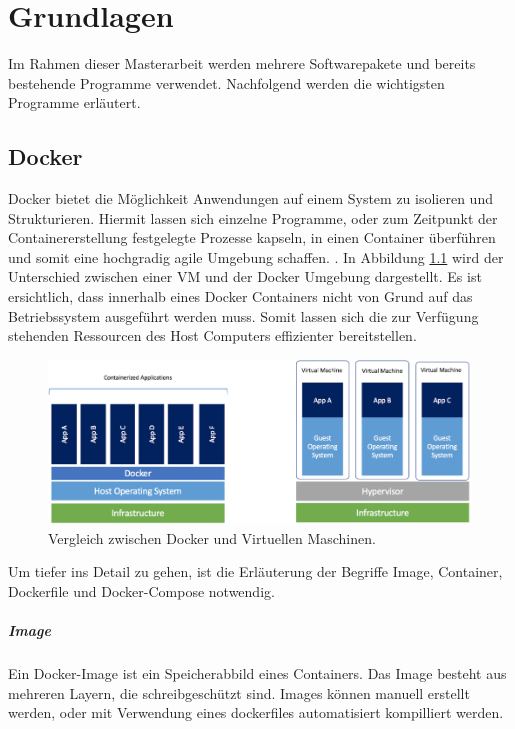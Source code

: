 \chapter{Grundlagen}
\label{Grundlagen}
Im Rahmen dieser Masterarbeit werden mehrere Softwarepakete und bereits bestehende Programme verwendet. Nachfolgend werden die wichtigsten Programme erläutert.
	\section{Docker}
	\label{Grundlagen:Docker}
		Docker bietet die Möglichkeit Anwendungen auf einem System zu isolieren und Strukturieren.
		Hiermit lassen sich einzelne Programme, oder zum Zeitpunkt der Containererstellung festgelegte Prozesse kapseln, in einen Container überführen und somit eine hochgradig agile Umgebung schaffen. \cite{dockerGetStarted}.
		In Abbildung \ref{fig:Grundlagen:Docker:DockerVsVM} wird der Unterschied zwischen einer \gls{VM} und der Docker Umgebung dargestellt.
		Es ist ersichtlich, dass innerhalb eines Docker Containers nicht von Grund auf das Betriebssystem ausgeführt werden muss. 
		Somit lassen sich die zur Verfügung stehenden Ressourcen des Host Computers effizienter bereitstellen.
		\begin{figure}[H]
			\centering
			\includegraphics[width=\textwidth]{"Bilder/DockerVsVM.png"}
			\caption{Vergleich zwischen Docker und Virtuellen Maschinen. \cite{dockerVsVM}}
			\label{fig:Grundlagen:Docker:DockerVsVM}					
		\end{figure}
		Um tiefer ins Detail zu gehen, ist die Erläuterung der Begriffe Image, Container, Dockerfile und Docker-Compose notwendig.
		\paragraph{Image}
			Ein Docker-Image ist ein Speicherabbild eines Containers. 
			Das Image besteht aus mehreren Layern, die schreibgeschützt sind.
			Images können manuell erstellt werden, oder mit Verwendung eines dockerfiles automatisiert kompilliert werden.
			
